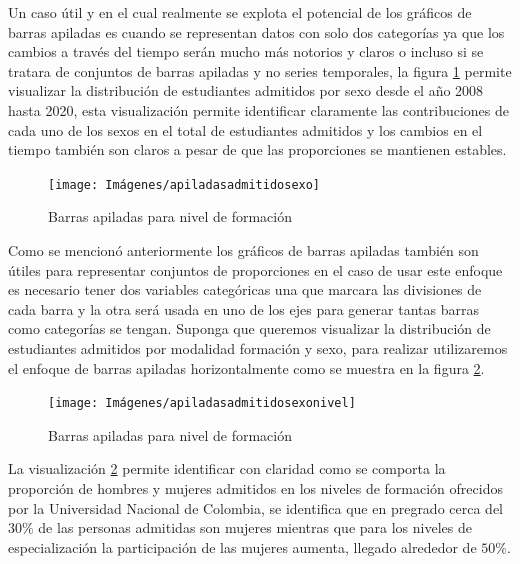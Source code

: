 \documentclass[
]{book}
\begin{document}
Un caso útil y en el cual realmente se explota el potencial de los gráficos de barras apiladas es cuando se representan datos con solo dos categorías ya que los cambios a través del tiempo serán mucho más notorios y claros o incluso si se tratara de conjuntos de barras apiladas y no series temporales, la figura \ref{fig:apiladasadmitidosexo-fig} permite visualizar la distribución de estudiantes admitidos por sexo desde el año 2008 hasta 2020, esta visualización permite identificar claramente las contribuciones de cada uno de los sexos en el total de estudiantes admitidos y los cambios en el tiempo también son claros a pesar de que las proporciones se mantienen estables.

\begin{figure}

{\centering \texttt{[image: Imágenes/apiladasadmitidosexo]} 

}

\caption{Barras apiladas para nivel de formación}\label{fig:apiladasadmitidosexo-fig}
\end{figure}

Como se mencionó anteriormente los gráficos de barras apiladas también son útiles para representar conjuntos de proporciones en el caso de usar este enfoque es necesario tener dos variables categóricas una que marcara las divisiones de cada barra y la otra será usada en uno de los ejes para generar tantas barras como categorías se tengan. Suponga que queremos visualizar la distribución de estudiantes admitidos por modalidad formación y sexo, para realizar utilizaremos el enfoque de barras apiladas horizontalmente como se muestra en la figura \ref{fig:apiladasadmitidosexonivel-fig}.

\begin{figure}

{\centering \texttt{[image: Imágenes/apiladasadmitidosexonivel]} 

}

\caption{Barras apiladas para nivel de formación}\label{fig:apiladasadmitidosexonivel-fig}
\end{figure}

La visualización \ref{fig:apiladasadmitidosexonivel-fig} permite identificar con claridad como se comporta la proporción de hombres y mujeres admitidos en los niveles de formación ofrecidos por la Universidad Nacional de Colombia, se identifica que en pregrado cerca del \(30\%\) de las personas admitidas son mujeres mientras que para los niveles de especialización la participación de las mujeres aumenta, llegado alrededor de \(50\%\).
\end{document}
